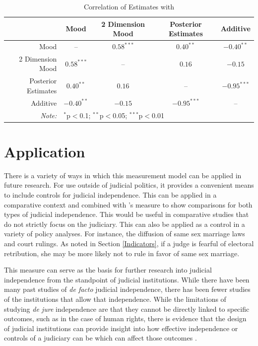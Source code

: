 \documentclass[12pt]{article}
\begin{document}
\begin{table}[ht]
	\centering\caption{Correlation of Estimates with \citet{Enns2013}}\label{EKCor}
	\begin{tabular}{rcccc}
		\hline
		&  Mood &  2 Dimension Mood & Posterior Estimates & Additive \\ 
		\hline
		Mood & -- & $0.58^{***}$ & $0.40^{**}$ & $-0.40^{**}$ \\ 
		2 Dimension Mood &  $0.58^{***}$ & -- & $0.16$ & $-0.15$ \\ 
		Posterior Estimates &  $0.40^{**}$  &  $0.16$  & -- & $-0.95^{***}$ \\ 
		Additive & $-0.40^{**}$  & $-0.15$  & $-0.95^{***}$ & -- \\ 
		\hline
		\textit{Note:}  & \multicolumn{4}{l}{$^{*}$p$<$0.1; $^{**}$p$<$0.05; $^{***}$p$<$0.01} \\
	\end{tabular}
\end{table}

\section{Application}\label{Application}
There is a variety of ways in which this measurement model can be applied in future research.  For use outside of judicial politics, it provides a convenient means to include controls for judicial independence.  This can be applied in a comparative context and combined with \citet{Linzer2014}'s measure to show comparisons for both types of judicial independence.  This would be useful in comparative studies that do not strictly focus on the judiciary.  This can also be applied as a control in a variety of policy analyses.  For instance, the diffusion of same sex marriage laws and court rulings.  As noted in Section \ref{Indicators}, if a judge is fearful of electoral retribution, she may be more likely not to rule in favor of same sex marriage.  

This measure can serve as the basis for further research into judicial independence from the standpoint of judicial institutions.  While there have been many past studies of \textit{de facto} judicial independence, there has been fewer studies of the institutions that allow that independence.  While the limitations of studying \textit{de jure} independence are that they cannot be directly linked to specific outcomes, such as in the case of human rights, there is evidence that the design of judicial institutions can provide insight into how effective independence or controls of a judiciary can be which can affect those outcomes \citep{Keith2002a,Keith2002b}.  
\end{document}
